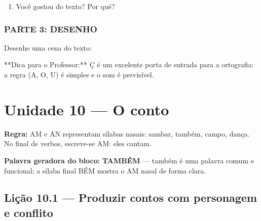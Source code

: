 \begin{exercicio}
\begin{enumerate}
  \item Você gostou do texto? Por quê?
  \begin{center}
  \underline{\hspace{12cm}}
  \end{center}

\end{enumerate}

\subsection*{PARTE 3: DESENHO}

Desenhe uma cena do texto:

\begin{center}
\end{center}

\end{exercicio}

\begin{dica}
**Dica para o Professor:** Ç é um excelente porta de entrada para a ortografia: a regra (A, O, U) é simples e o som é previsível.
\end{dica}



\chapter{Unidade 10 --- O conto}


\textbf{Regra:} AM e AN representam sílabas nasais: sambar, também, campo, dança. No final de verbos, escreve-se AM: eles cantam.

\textbf{Palavra geradora do bloco:} \textbf{TAMBÉM} --- também é uma palavra comum e funcional; a sílaba final BÉM mostra o AM nasal de forma clara.

\section{Lição 10.1 --- Produzir contos com personagem e conflito}

